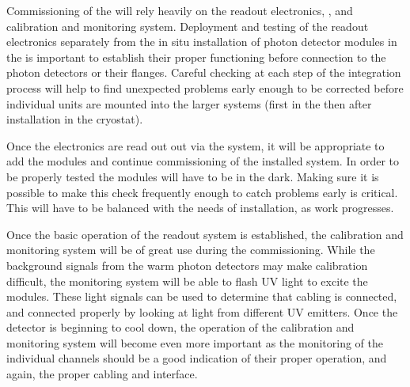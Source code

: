 Commissioning of the   will rely heavily on the readout electronics, , and calibration and monitoring system.  Deployment and testing of the readout electronics separately from the in situ installation of photon detector modules in the  is important to establish their proper functioning before connection to the photon detectors or their flanges.  Careful checking at each step of the integration process will help to find unexpected problems early enough to be corrected before individual units are mounted into the larger systems (first in the  then after installation in the cryostat). 

Once the electronics are read out out via the  system, it will be appropriate to add the  modules and continue commissioning of the installed system.  In order to be properly tested the  modules will have to be in the dark.  Making sure it is possible to make this check frequently enough to catch problems early is critical. This will have to be balanced with the needs of installation, as work progresses.  

Once the basic operation of the readout system is established, the calibration and monitoring system will be of great use during the commissioning.  While the background signals from the warm photon detectors may make calibration difficult, the monitoring system will be able to flash UV light to excite the  modules.  These light signals can be used to determine that cabling is connected, and connected properly by looking at light from different UV emitters.  Once the detector is beginning to cool down, the operation of the calibration and monitoring system will become even more important as the monitoring of the individual channels should be a good indication of their proper operation, and again, the proper cabling and interface.


%



